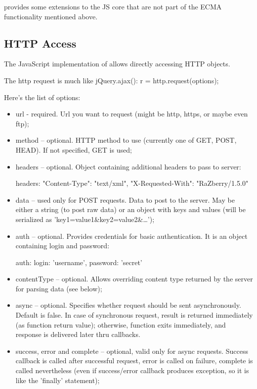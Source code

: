 \zway provides some extensions to the JS core that are not part of the ECMA 
functionality mentioned above.

\subsection{HTTP Access}

The JavaScript implementation of \zway allows directly accessing HTTP objects.

The http request is much like jQuery.ajax(): r = http.request(options);

Here's the list of options:
\begin{itemize}
\item url - required. Url you want to request (might be http, https, or maybe even ftp);
\item method – optional. HTTP method to use (currently one of GET, POST, HEAD). If not 
specified, GET is used;
\item headers – optional. Object containing additional headers to pass to server:

\begin{listingverbatim}
headers: {
    "Content-Type": "text/xml",
    "X-Requested-With": "RaZberry/1.5.0"
}
\end{listingverbatim}

\item data – used only for POST requests. Data to post to the server. May be either a
string (to post raw data) or an object with keys and values (will be serialized as 
'key1=value1\&key2=value2\&…');
\item auth – optional. Provides credentials for basic authentication. It is an object 
containing login and password:

\begin{listingverbatim}
auth: {
    login: 'username',
    password: 'secret'
}
\end{listingverbatim}

\item contentType – optional. Allows overriding content type returned by the server for 
parsing data (see below);
\item async – optional. Specifies whether request should be sent asynchronously. Default 
is false. In case of synchronous request, result is returned immediately (as function 
return value); otherwise, function exits immediately, and response is delivered later 
thru callbacks.
\item success, error and complete – optional, valid only for async requests. Success 
callback is called after successful request, error is called on failure, complete is 
called nevertheless (even if success/error callback produces exception, so it is like 
the 'finally' statement);
\end{itemize}

